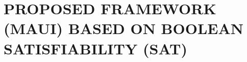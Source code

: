 \section{PROPOSED FRAMEWORK (MAUI) BASED ON BOOLEAN SATISFIABILITY (SAT)}
\label{sec:framework}
\begin{comment}
There exist two basic idea in the proposed framework for aging tolerance. The two idea are based on time-borrowing, so as to mitigate the aging-induced performance degradation of logic network. The first idea is based on aging manipulation by inserting \textit{duty-cycle converters} (DCCs) in the existing clock tree. The second idea is based on V\textsubscript{th} assignment of clock buffers by inserting the technology leaders in the clock tree. This way, we can intentionally create aging-induced and tech-induced clock skews, which can compensate for the performance degradation of the logic circuit based on time borrowing. We formulate the problem using Boolean satisfiability (SAT) and thanks to the efficiency of existing SAT solvers, the optimal solution can be obtained efficiently. The end result of this formulation is the locations (in the existing clock tree) of DCCs and technology leaders such that, when aging-induced and tech-induced clock skews are considered, the required clock period of the given circuit under $n$-year BTI is minimized. The clock period can be minimized since the performance degradation of the logic circuit is \enquote{tolerated} as a result of useful (aging-induced and tech-induced) clock skews. The minimum required clock period thus implies maximum level of aging tolerance. Note that, as mentioned in \ref{sec:motivate:exp2}, we re-assign V\textsubscript{th} of clock buffers, based on the insertion of technology leader\footnote{Technology leader is an imaginary location instead of a physical gate such as DCC. It indicates the location where we begin assigning new-V\textsubscript{th} to clock buffers toward flip-flops, but exclude flip-flops (i.e., the V\textsubscript{th} of flip-flops will not be re-assigned to new counterpart.}, from which we begin assigning new-V\textsubscript{th} to the downstream\footnote{The downstream clock buffers are those between imaginary technology leader and flip-flops. We use the adjective "downstream" to describe the clock buffers, based on the direction that clock signal pass toward (i.e., clock signal is generated from clock source, passes through clock buffers, and finally arrives at flip-flops).} clock buffers toward flip-flops.
\end{comment}

